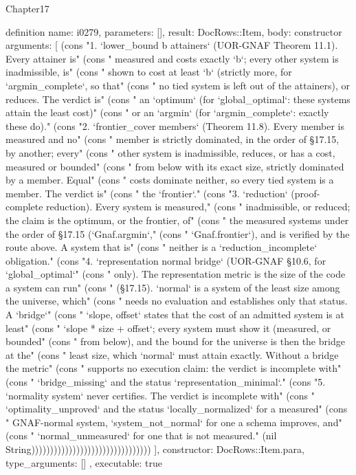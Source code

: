 \begin{lexlean}{Chapter17}
\begin{semanticmodule}
definition{
  name: i0279,
  parameters: [],
  result: DocRows::Item,
  body: constructor{
    arguments: [
      (cons "1. `lower_bound b attainers` (UOR-GNAF Theorem 11.1). Every attainer is" (cons "   measured and costs exactly `b`; every other system is inadmissible, is" (cons "   shown to cost at least `b` (strictly more, for `argmin_complete`, so that" (cons "   no tied system is left out of the attainers), or reduces. The verdict is" (cons "   an `optimum` (for `global_optimal`: these systems attain the least cost)" (cons "   or an `argmin` (for `argmin_complete`: exactly these do)." (cons "2. `frontier_cover members` (Theorem 11.8). Every member is measured and no" (cons "   member is strictly dominated, in the order of §17.15, by another; every" (cons "   other system is inadmissible, reduces, or has a cost, measured or bounded" (cons "   from below with its exact size, strictly dominated by a member. Equal" (cons "   costs dominate neither, so every tied system is a member. The verdict is" (cons "   the `frontier`." (cons "3. `reduction` (proof-complete reduction). Every system is measured," (cons "   inadmissible, or reduced; the claim is the optimum, or the frontier, of" (cons "   the measured systems under the order of §17.15 (`Gnaf.argmin`," (cons "   `Gnaf.frontier`), and is verified by the route above. A system that is" (cons "   neither is a `reduction_incomplete` obligation." (cons "4. `representation normal bridge` (UOR-GNAF §10.6, for `global_optimal`" (cons "   only). The representation metric is the size of the code a system can run" (cons "   (§17.15). `normal` is a system of the least size among the universe, which" (cons "   needs no evaluation and establishes only that status. A `bridge`" (cons "   `{slope, offset}` states that the cost of an admitted system is at least" (cons "   `slope * size + offset`; every system must show it (measured, or bounded" (cons "   from below), and the bound for the universe is then the bridge at the" (cons "   least size, which `normal` must attain exactly. Without a bridge the metric" (cons "   supports no execution claim: the verdict is incomplete with" (cons "   `bridge_missing` and the status `representation_minimal`." (cons "5. `normality system` never certifies. The verdict is incomplete with" (cons "   `optimality_unproved` and the status `locally_normalized` for a measured" (cons "   GNAF-normal system, `system_not_normal` for one a schema improves, and" (cons "   `normal_unmeasured` for one that is not measured." (nil String))))))))))))))))))))))))))))))))
    ],
    constructor: DocRows::Item.para,
    type_arguments: []
  },
  executable: true
}


\end{semanticmodule}
\end{lexlean}
